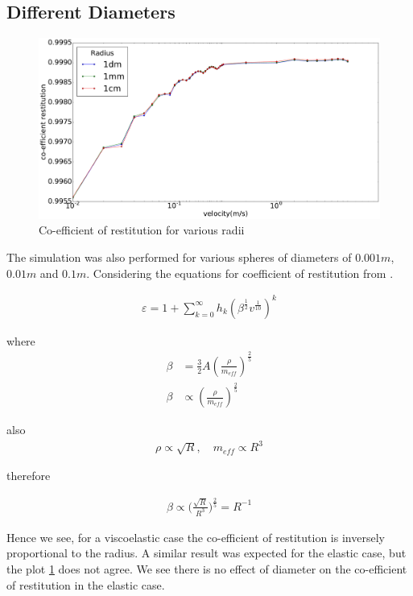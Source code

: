 
\subsection{Different Diameters}

\begin{figure}[H]
\includegraphics[width=1.0\textwidth]{../images/parametricStudy/CORvsVELdiffDAI_pdf.pdf}
\caption{Co-efficient of restitution for various radii}
\label{fig:CORDiffDia}
\end{figure}

The simulation was also performed for various spheres of diameters of $0.001m$, $0.01m$ and $0.1m$. Considering the equations for coefficient of restitution from \citep{muller} .

\begin{align*}
\varepsilon = 1+ \sum_{k=0}^{\infty} h_{k}(\beta^{\frac{1}{2}} v^{\frac{1}{10}})^{k} 
\end{align*}

where
\begin{align*}
\beta &= \frac{3}{2} A (\frac{\rho}{m_{eff}})^{\frac{2}{5}} \\
\beta &\propto (\frac{\rho}{m_{eff}})^{\frac{2}{5}}
\end{align*}

also 
\begin{align*}
\rho \propto \sqrt{R}, \quad m_{eff} \propto R^{3}
\end{align*}

therefore

\begin{align*}
\beta \propto \Big( \frac{\sqrt{R}}{R^{3}} \Big)^{\frac{2}{5}} = R^{-1}
\end{align*}

Hence we see, for a viscoelastic case the co-efficient of restitution is inversely proportional to the radius. A similar result was expected for the elastic case, but the plot \ref{fig:CORDiffDia} does not agree. We see there is no effect of diameter on the co-efficient of restitution in the elastic case.




